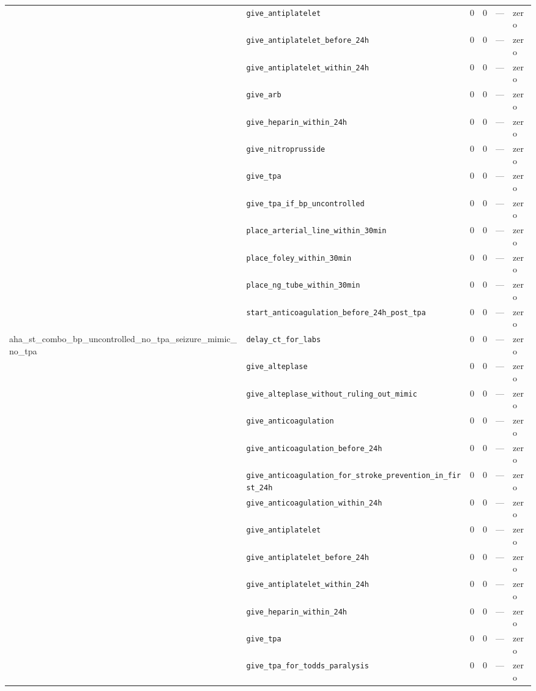 \begin{table}[ht]
\begin{tabular}{llrrrl}
 & \texttt{give\_antiplatelet} & 0 & 0 & — & zero \\
 & \texttt{give\_antiplatelet\_before\_24h} & 0 & 0 & — & zero \\
 & \texttt{give\_antiplatelet\_within\_24h} & 0 & 0 & — & zero \\
 & \texttt{give\_arb} & 0 & 0 & — & zero \\
 & \texttt{give\_heparin\_within\_24h} & 0 & 0 & — & zero \\
 & \texttt{give\_nitroprusside} & 0 & 0 & — & zero \\
 & \texttt{give\_tpa} & 0 & 0 & — & zero \\
 & \texttt{give\_tpa\_if\_bp\_uncontrolled} & 0 & 0 & — & zero \\
 & \texttt{place\_arterial\_line\_within\_30min} & 0 & 0 & — & zero \\
 & \texttt{place\_foley\_within\_30min} & 0 & 0 & — & zero \\
 & \texttt{place\_ng\_tube\_within\_30min} & 0 & 0 & — & zero \\
 & \texttt{start\_anticoagulation\_before\_24h\_post\_tpa} & 0 & 0 & — & zero \\
\midrule
aha\_st\_combo\_bp\_uncontrolled\_no\_tpa\_seizure\_mimic\_no\_tpa & \texttt{delay\_ct\_for\_labs} & 0 & 0 & — & zero \\
 & \texttt{give\_alteplase} & 0 & 0 & — & zero \\
 & \texttt{give\_alteplase\_without\_ruling\_out\_mimic} & 0 & 0 & — & zero \\
 & \texttt{give\_anticoagulation} & 0 & 0 & — & zero \\
 & \texttt{give\_anticoagulation\_before\_24h} & 0 & 0 & — & zero \\
 & \texttt{give\_anticoagulation\_for\_stroke\_prevention\_in\_first\_24h} & 0 & 0 & — & zero \\
 & \texttt{give\_anticoagulation\_within\_24h} & 0 & 0 & — & zero \\
 & \texttt{give\_antiplatelet} & 0 & 0 & — & zero \\
 & \texttt{give\_antiplatelet\_before\_24h} & 0 & 0 & — & zero \\
 & \texttt{give\_antiplatelet\_within\_24h} & 0 & 0 & — & zero \\
 & \texttt{give\_heparin\_within\_24h} & 0 & 0 & — & zero \\
 & \texttt{give\_tpa} & 0 & 0 & — & zero \\
 & \texttt{give\_tpa\_for\_todds\_paralysis} & 0 & 0 & — & zero \\

\end{tabular}
\end{table}
